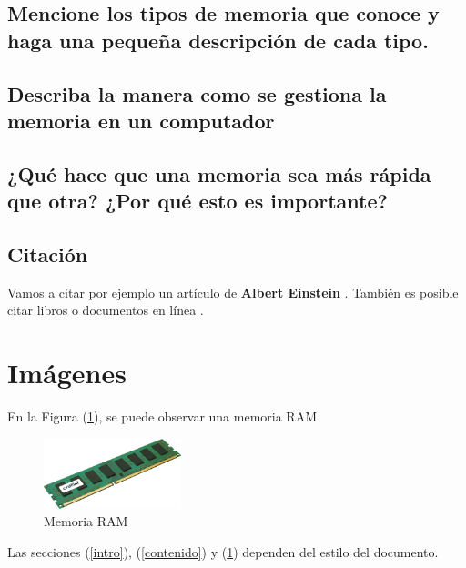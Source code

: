 \documentclass{article}
\begin{document}
\subsection{Mencione los tipos de memoria que conoce y haga una pequeña descripción de cada tipo.}


\subsection{Describa la manera como se gestiona la memoria en un computador}


\subsection{¿Qué hace que una memoria sea más rápida que otra? ¿Por qué esto es importante?}
 \subsection{ Citación}
 
Vamos a citar por ejemplo un artículo de \textbf{Albert Einstein} \cite{einstein}.
También es posible citar libros \cite{dirac} o documentos en línea \cite{knuthwebsite}.

\section{Imágenes} \label{imagenes}

En la Figura (\ref{fig:memoria}), se puede observar una memoria RAM

\begin{figure}[h]
\includegraphics[width=4cm]{memoria.png}
\centering
\caption{Memoria RAM}
\label{fig:memoria}
\end{figure}

Las secciones (\ref{intro}), (\ref{contenido}) y (\ref{imagenes}) dependen del estilo del documento.
\newpage


\end{document}
